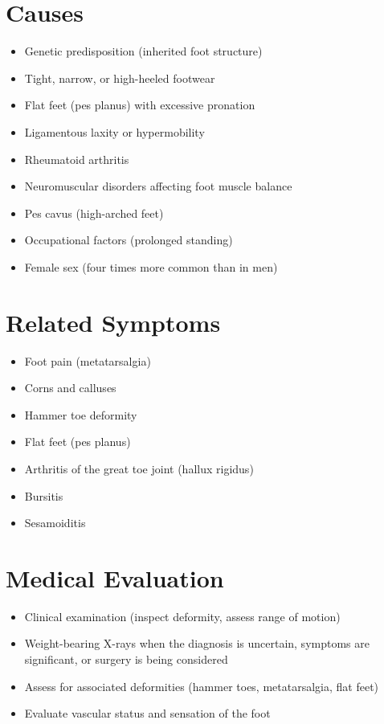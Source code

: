 \section*{Causes}
\begin{itemize}
\item Genetic predisposition (inherited foot structure)
\item Tight, narrow, or high-heeled footwear
\item Flat feet (pes planus) with excessive pronation
\item Ligamentous laxity or hypermobility
\item Rheumatoid arthritis
\item Neuromuscular disorders affecting foot muscle balance
\item Pes cavus (high-arched feet)
\item Occupational factors (prolonged standing)
\item Female sex (four times more common than in men)
\end{itemize}

\section*{Related Symptoms}
\begin{itemize}
\item Foot pain (metatarsalgia)
\item Corns and calluses
\item Hammer toe deformity
\item Flat feet (pes planus)
\item Arthritis of the great toe joint (hallux rigidus)
\item Bursitis
\item Sesamoiditis
\end{itemize}

\section*{Medical Evaluation}
\begin{itemize}
\item Clinical examination (inspect deformity, assess range of motion)
 \item Weight-bearing X-rays when the diagnosis is uncertain, symptoms are significant, or surgery is being considered
\item Assess for associated deformities (hammer toes, metatarsalgia, flat feet)
\item Evaluate vascular status and sensation of the foot
\end{itemize}

